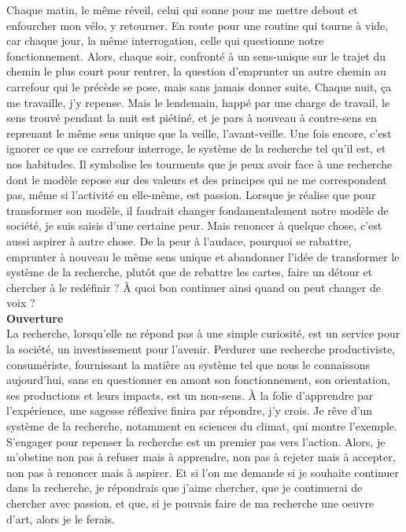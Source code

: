 Chaque matin, le même réveil, celui qui sonne pour me mettre debout et enfourcher mon vélo, y retourner. En route pour une routine qui tourne à vide, car chaque jour, la même interrogation, celle qui questionne notre fonctionnement. Alors, chaque soir, confronté à un sens-unique sur le trajet du chemin le plus court pour rentrer, la question d'emprunter un autre chemin au carrefour qui le précède se pose, mais sans jamais donner suite. Chaque nuit, ça me travaille, j'y repense. Mais le lendemain, happé par une charge de travail, le sens trouvé pendant la nuit est piétiné, et je pars à nouveau à contre-sens en reprenant le même sens unique que la veille, l'avant-veille. Une fois encore, c'est ignorer ce que ce carrefour interroge, le système de la recherche tel qu'il est, et nos habitudes. Il symbolise les tourments que je peux avoir face à une recherche dont le modèle repose sur des valeurs et des principes qui ne me correspondent pas, même si l'activité en elle-même, est passion. Lorsque je réalise que pour transformer son modèle, il faudrait changer fondamentalement notre modèle de société, je suis saisis d'une certaine peur. Mais renoncer à quelque chose, c'est aussi aspirer à autre chose. De la peur à l'audace, pourquoi se rabattre, emprunter à nouveau le même sens unique et abandonner l'idée de transformer le système de la recherche, plutôt que de rebattre les cartes, faire un détour et chercher à le redéfinir ? À quoi bon continuer ainsi quand on peut changer de voix ?
\\


{\noindent\Large\textbf{Ouverture}}
\\

La recherche, lorsqu'elle ne répond pas à une simple curiosité, est un service pour la société, un investissement pour l'avenir. Perdurer une recherche productiviste, consumériste, fournissant la matière au système tel que nous le connaissons aujourd'hui, sans en questionner en amont son fonctionnement, son orientation, ses productions et leurs impacts, est un non-sens. À la folie d'apprendre par l'expérience, une sagesse réflexive finira par répondre, j'y crois. Je rêve d'un système de la recherche, notamment en sciences du climat, qui montre l'exemple. S'engager pour repenser la recherche est un premier pas vers l'action. Alors, je m'obstine non pas à refuser mais à apprendre, non pas à rejeter mais à accepter, non pas à renoncer mais à aspirer. Et si l'on me demande si je souhaite continuer dans la recherche, je répondrais que j'aime chercher, que je continuerai de chercher avec passion, et que, si je pouvais faire de ma recherche une oeuvre d'art, alors je le ferais.
\\


























